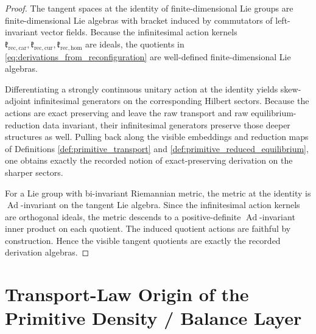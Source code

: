 \documentclass[11pt]{article}
\begin{document}
\begin{proof}
The tangent spaces at the identity of finite-dimensional Lie groups are finite-dimensional Lie algebras with bracket induced by commutators of left-invariant vector fields. Because the infinitesimal action kernels \(\mathfrak k_{\mathrm{rec,car}},\mathfrak k_{\mathrm{rec,cur}},\mathfrak k_{\mathrm{rec,hom}}\) are ideals, the quotients in \eqref{eq:derivations_from_reconfiguration} are well-defined finite-dimensional Lie algebras.

Differentiating a strongly continuous unitary action at the identity yields skew-adjoint infinitesimal generators on the corresponding Hilbert sectors. Because the actions are exact preserving and leave the raw transport and raw equilibrium-reduction data invariant, their infinitesimal generators preserve those deeper structures as well. Pulling back along the visible embeddings and reduction maps of Definitions \ref{def:primitive_transport} and \ref{def:primitive_reduced_equilibrium}, one obtains exactly the recorded notion of exact-preserving derivation on the sharper sectors.

For a Lie group with bi-invariant Riemannian metric, the metric at the identity is \(\operatorname{Ad}\)-invariant on the tangent Lie algebra. Since the infinitesimal action kernels are orthogonal ideals, the metric descends to a positive-definite \(\operatorname{Ad}\)-invariant inner product on each quotient. The induced quotient actions are faithful by construction. Hence the visible tangent quotients are exactly the recorded derivation algebras.
\end{proof}

\section{Transport-Law Origin of the Primitive Density / Balance Layer}
\end{document}
